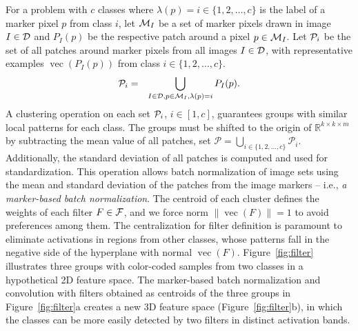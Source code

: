 \documentclass[journal, twoside]{IEEEtran}
\DeclareMathOperator{\vect}{vec}
\newcommand{\R}{\mathbb{R}}
\begin{document}
For a problem with $c$ classes where $\lambda(p)=i\in \{1,2,\ldots,c\}$ is the label of a marker pixel $p$ from class $i$, let ${\cal M}_I$ be a set of marker pixels drawn in image $I\in {\cal D}$ and $P_I(p)$ be the respective patch around a pixel $p\in {\cal M}_I$. Let ${\cal P}_i$ be the set of all patches around marker pixels from all images $I\in {\cal D}$, with representative examples  $\vect(P_I(p))$ from class $i\in \{1,2,\ldots,c\}$. 
\begin{eqnarray}
{\cal P}_i & = & \bigcup_{I\in {\cal D},p\in {\cal M}_I, \lambda(p) = i}{P_I(p)}.
\label{eq:pset}
\end{eqnarray}
A clustering operation on each set ${\cal P}_i$, $i\in [1,c]$, guarantees groups with similar local patterns for each class. The groups must be shifted to the origin of $\R^{k\times k\times m}$ by subtracting the mean value of all patches, set $\mathcal{P} = \bigcup_{i \in \{1, 2, \ldots, c\}}{\mathcal{P}_i}$. Additionally, the standard deviation of all patches is computed and used for standardization. This operation allows batch normalization of image sets using the mean and standard deviation of the patches from the image markers -- i.e.,  \emph{a marker-based batch normalization}. The centroid of each cluster defines the weights of each filter $F\in {\cal F}$, and we force norm $\|\vect(F)\|=1$ to avoid preferences among them. The centralization for filter definition is paramount to eliminate activations in regions from other classes, whose patterns fall in the negative side of the hyperplane with normal $\vect(F)$. Figure~\ref{fig:filter} illustrates three groups with color-coded samples from two classes in a hypothetical 2D feature space. The marker-based batch normalization and convolution with filters obtained as centroids of the three groups in Figure~\ref{fig:filter}a creates a new 3D feature space (Figure~\ref{fig:filter}b), in which the classes can be more easily detected by two filters in distinct activation bands.
\end{document}
